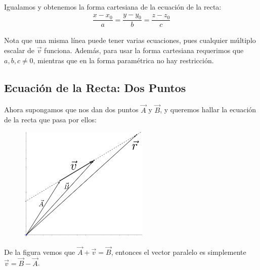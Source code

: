 \documentclass[12pt, fleqn]{report}                             %
\theoremstyle{break}                                            %
\begin{document}
                Igualamos y obtenemos la forma cartesiana de la ecuación de la recta:
                \begin{align}
                      \dfrac{x - x_0}{a} 
                    = \dfrac{y - y_0}{b}
                    = \dfrac{z - z_0}{c} \label{lineEquation1}
                \end{align}
                
                Nota que una misma línea puede tener varias ecuaciones, pues cualquier múltiplo
                escalar de $\vec{v}$ funciona. Además, para usar la forma cartesiana requerimos
                que $a, b, c\neq 0$, mientras que en la forma paramétrica no hay restricción.
                


            \subsection{Ecuación de la Recta: Dos Puntos}
            
                Ahora supongamos que nos dan dos puntos $\vec{A}$ y $\vec{B}$, y queremos hallar
                la ecuación de la recta que pasa por ellos:
                
                \begin{figure}[H]
                    \centering
                    \includegraphics[width=0.55\textwidth]{line2}
                \end{figure}
            
                De la figura vemos que $\vec{A}+\vec{v}=\vec{B}$, entonces el vector paralelo es
                simplemente $\vec{v} = \vec{B} - \vec{A}$.
\end{document}
